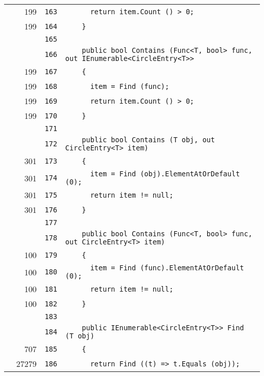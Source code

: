 \documentclass[a4paper,10pt]{article}
\begin{document}
\begin{longtable}[l]{lrrl}
\cellcolor{green} & 199 & \verb~163~ & \verb~      return item.Count () > 0;~\\
\cellcolor{green} & 199 & \verb~164~ & \verb~    }~\\
\cellcolor{gray} &  & \verb~165~ & \verb~~\\
\cellcolor{gray} &  & \verb~166~ & \verb~    public bool Contains (Func<T, bool> func, out IEnumerable<CircleEntry<T>> ~\\
\cellcolor{green} & 199 & \verb~167~ & \verb~    {~\\
\cellcolor{green} & 199 & \verb~168~ & \verb~      item = Find (func);~\\
\cellcolor{green} & 199 & \verb~169~ & \verb~      return item.Count () > 0;~\\
\cellcolor{green} & 199 & \verb~170~ & \verb~    }~\\
\cellcolor{gray} &  & \verb~171~ & \verb~~\\
\cellcolor{gray} &  & \verb~172~ & \verb~    public bool Contains (T obj, out CircleEntry<T> item)~\\
\cellcolor{green} & 301 & \verb~173~ & \verb~    {~\\
\cellcolor{green} & 301 & \verb~174~ & \verb~      item = Find (obj).ElementAtOrDefault (0);~\\
\cellcolor{green} & 301 & \verb~175~ & \verb~      return item != null;~\\
\cellcolor{green} & 301 & \verb~176~ & \verb~    }~\\
\cellcolor{gray} &  & \verb~177~ & \verb~~\\
\cellcolor{gray} &  & \verb~178~ & \verb~    public bool Contains (Func<T, bool> func, out CircleEntry<T> item)~\\
\cellcolor{green} & 100 & \verb~179~ & \verb~    {~\\
\cellcolor{green} & 100 & \verb~180~ & \verb~      item = Find (func).ElementAtOrDefault (0);~\\
\cellcolor{green} & 100 & \verb~181~ & \verb~      return item != null;~\\
\cellcolor{green} & 100 & \verb~182~ & \verb~    }~\\
\cellcolor{gray} &  & \verb~183~ & \verb~~\\
\cellcolor{gray} &  & \verb~184~ & \verb~    public IEnumerable<CircleEntry<T>> Find (T obj)~\\
\cellcolor{green} & 707 & \verb~185~ & \verb~    {~\\
\cellcolor{green} & 27279 & \verb~186~ & \verb~      return Find ((t) => t.Equals (obj));~\\

\end{longtable}
\end{document}
